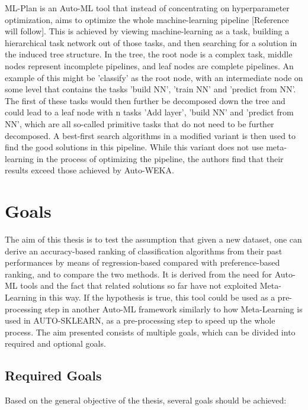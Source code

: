 \documentclass[12pt]{scrartcl}
\begin{document}
ML-Plan is an Auto-ML tool that instead of concentrating on hyperparameter optimization, aims to optimize the whole machine-learning pipeline [Reference will follow]. This is achieved by viewing machine-learning as a task, building a hierarchical task network out of those tasks, and then searching for a solution in the induced tree structure. In the tree, the root node is a complex task, middle nodes represent incomplete pipelines, and leaf nodes are complete pipelines. An example of this might be 'classify' as the root node, with an intermediate node on some level that contains the tasks 'build NN', 'train NN' and 'predict from NN'. The first of these tasks would then further be decomposed down the tree and could lead to a leaf node with n tasks 'Add layer', 'build NN' and 'predict from NN', which are all so-called primitive tasks that do not need to be further decomposed. A best-first search algorithms in a modified variant is then used to find the good solutions in this pipeline. While this variant does not use meta-learning in the process of optimizing the pipeline, the authors find that their results exceed those achieved by Auto-WEKA.\\

\section{Goals}\label{sec:goals}
The aim of this thesis is to test the assumption that given a new dataset, one can derive an accuracy-based ranking of classification algorithms from their past performances by means of regression-based compared with preference-based ranking, and to compare the two methods. It is derived from the need for Auto-ML tools and the fact that related solutions so far have not exploited Meta-Learning in this way. If the hypothesis is true, this tool could be used as a pre-processing step in another Auto-ML framework similarly to how Meta-Learning is used in AUTO-SKLEARN, as a pre-processing step to speed up the whole process. The aim presented consists of multiple goals, which can be divided into required and optional goals.

\subsection{Required Goals}\label{subsec:required_goals}
Based on the general objective of the thesis, several goals should be achieved:
\end{document}
